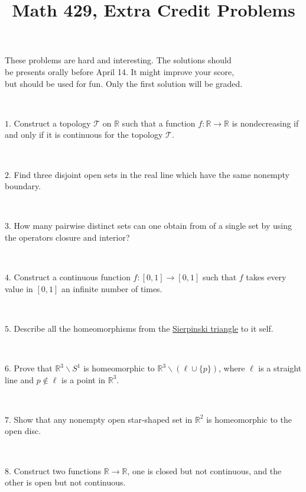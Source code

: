 \documentclass{article}
\def\noi{\noindent}%
\def\RR{\mathbb{R}}%
\def\:{\colon}
\begin{document}
\title{Math 429, Extra Credit Problems}
\author{}
\date{}
\maketitle

\begin{center}
{\small These problems are hard and interesting. The solutions should \\
be presents orally before April 14. It might improve your score,\\
but should be used for fun. Only the first solution will be graded.}
\end{center}
\thispagestyle{empty}

\ 


\noi $1$. Construct a topology $\mathcal{T}$ on $\RR$ such that a function $f\:\RR\to\RR$ is nondecreasing if and only if it is continuous for the topology $\mathcal{T}$.

\ 


\noi $2$. 
Find three disjoint open sets in the real line 
which have the same nonempty boundary. 

\ 

\noi $3$. How many pairwise distinct sets can one obtain
from of a single set by using the operators closure and interior?

\ 

\noi $4$. Construct a continuous function 
$f\:[0,1]\rightarrow [0,1]$ such that $f$ takes every value in $[0,1]$ 
an infinite number of times.

\ 

\noi $5$. Describe all the homeomorphisms from the \href{http://en.wikipedia.org/wiki/Sierpinski_triangle}{Sierpinski triangle} to it self.

\ 

\noi $6$. Prove that $\RR^3\backslash S^1$ is homeomorphic to $\RR^3\backslash (\ell\cup \{p\})$, where $\ell$ is a straight line and $p\not\in\ell$ is a point in $\RR^3$.


\ 


\noi $7.$ Show that any nonempty open star-shaped set in $\RR^2$ is homeomorphic to the open disc.

\ 


\noi $8.$ Construct two functions $\RR\to\RR$, one is closed but not continuous, and the other is open but not continuous.
\end{document}
